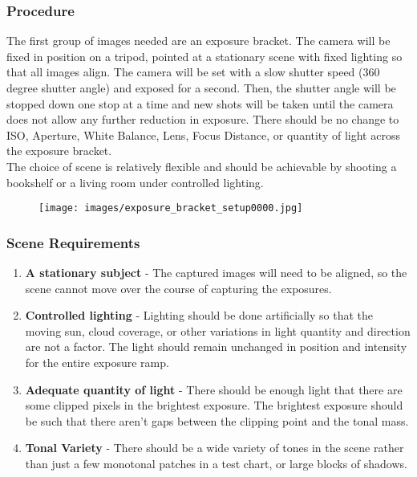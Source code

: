 \documentclass[twoside]{article}
\begin{document}
\subsubsection{Procedure}
The first group of images needed are an exposure bracket. The camera will be fixed in position on a tripod, pointed at a stationary scene with fixed lighting so that all images align. The camera will be set with a slow shutter speed (360 degree shutter angle) and exposed for a second. Then, the shutter angle will be stopped down one stop at a time and new shots will be taken until the camera does not allow any further reduction in exposure. There should be no change to ISO, Aperture, White Balance, Lens, Focus Distance, or quantity of light across the exposure bracket. \\

The choice of scene is relatively flexible and should be achievable by shooting a bookshelf or a living room under controlled lighting. \\

\begin{figure}[h]
    \centering
    \texttt{[image: images/exposure\_bracket\_setup0000.jpg]}
\end{figure}


\subsubsection{Scene Requirements}
\begin{enumerate}
    \item \textbf{A stationary subject} - The captured images will need to be aligned, so the scene cannot move over the course of capturing the exposures.
    \item \textbf{Controlled lighting} - Lighting should be done artificially so that the moving sun, cloud coverage, or other variations in light quantity and direction are not a factor. The light should remain unchanged in position and intensity for the entire exposure ramp.
    \item \textbf{Adequate quantity of light} - There should be enough light that there are some clipped pixels in the brightest exposure. The brightest exposure should be such that there aren't gaps between the clipping point and the tonal mass.
    \item \textbf{Tonal Variety} - There should be a wide variety of tones in the scene rather than just a few monotonal patches in a test chart, or large blocks of shadows.
\end{enumerate}
\end{document}
